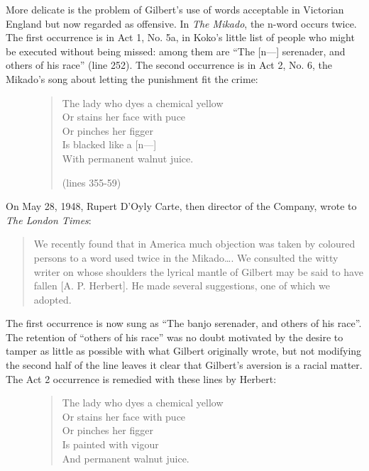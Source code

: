 \begin{paper}
More delicate is the problem of Gilbert's use of words acceptable in
Victorian England but now regarded as offensive. In \emph{The Mikado},
the n-word\label{nword} occurs twice. The first occurrence is in Act 1, No.
5a, in Koko's little list of people who might be executed without being
missed: among them are ``The [n---] serenader, and others of his race''
(line 252). The second occurrence is in Act 2, No. 6, the Mikado's song
about letting the punishment fit the crime:

\begin{figure}[H]
\begin{quote}
The lady who dyes a chemical yellow\\
Or stains her face with puce\\
Or pinches her figger\\
Is blacked like a [n---]\\
With permanent walnut juice.\\
\begin{flushright}(lines 355-59)\end{flushright}
\end{quote}
\end{figure}

\noindent On May 28, 1948, Rupert D'Oyly Carte, then director of the Company,
wrote to \emph{The London Times}:

\begin{quote}
We recently found that in America much objection was taken by coloured
persons to a word used twice in the Mikado\ldots{}. We consulted the
witty writer on whose shoulders the lyrical mantle of Gilbert may be
said to have fallen {[}A. P. Herbert{]}. He made several suggestions,
one of which we adopted.
\end{quote}

\noindent The first occurrence is now sung as ``The banjo serenader, and others of
his race''. The retention of ``others of his race'' was no doubt
motivated by the desire to tamper as little as possible with what
Gilbert originally wrote, but not modifying the second half of the line
leaves it clear that Gilbert's aversion is a racial matter. The Act 2
occurrence is remedied with these lines by Herbert:

\begin{figure}[H]
\begin{quote}
The lady who dyes a chemical yellow\\
Or stains her face with puce\\
Or pinches her figger\\
Is painted with vigour\\
And permanent walnut juice.
\end{quote}


\end{figure}
\end{paper}
